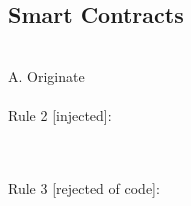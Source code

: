 \documentclass[a4paper]{llncs}
\begin{document}
\subsection{Smart Contracts}
~\\
A. Originate
~\\
~\\

Rule 2 [injected]:

\begin{mathpar}
\end{mathpar}
~\\
~\\
Rule 3 [rejected of code]:
\end{document}

